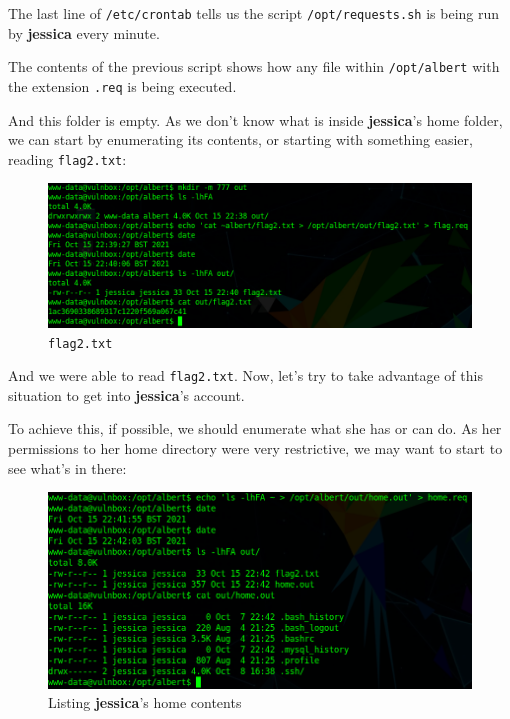 \documentclass[12pt]{article}
\begin{document}
    The last line of \texttt{/etc/crontab} tells us the script
    \texttt{/opt/requests.sh} is being run by \textbf{jessica} every minute.

    The contents of the previous script shows how any file within
    \verb!/opt/albert! with the extension \verb!.req! is being executed.

    And this folder is empty. As we don't know what is inside
    \textbf{jessica}'s home folder, we can start by enumerating its contents,
    or starting with something easier, reading \texttt{flag2.txt}:

    \begin{figure}[H]\label{pic:52-cronjob-cat-flag2}
        \centering
        \includegraphics[width=1.00\textwidth]{52-cronjob-cat-flag2.png}
        \caption{\texttt{flag2.txt}}
    \end{figure}

    And we were able to read \texttt{flag2.txt}. Now, let's try to take
    advantage of this situation to get into \textbf{jessica}'s account.

    To achieve this, if possible, we should enumerate what she has or can do. As
    her permissions to her home directory were very restrictive, we may want to
    start to see what's in there:

    \begin{figure}[H]\label{pic:53-cronjob-ls-home}
        \centering
        \includegraphics[width=1.00\textwidth]{53-cronjob-ls-home.png}
        \caption{Listing \textbf{jessica}'s home contents}
    \end{figure}
\end{document}
